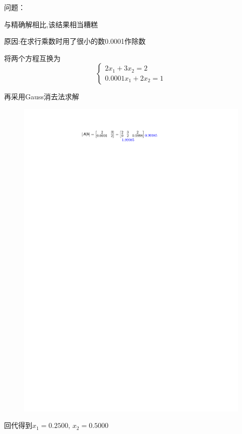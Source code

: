 \begin{note}
    问题：

    与精确解相比,该结果相当糟糕
    
    原因:在求行乘数时用了很小的数0.0001作除数
\end{note}
\begin{example}
    将两个方程互换为
    \[
        \left\{
            \begin{array}{rl}
                2x_1+3x_2=2\\
                0.0001x_1+2x_2=1
            \end{array}
        \right.
    \]
    \begin{solution}
        再采用Gauss消去法求解
        \begin{figure}[h]
            \centering
            \includegraphics{image/Gauss-example2.pdf}
        \end{figure}
        回代得到$x_1 = 0.2500,\,x_2 = 0.5000$
    \end{solution}
\end{example}
